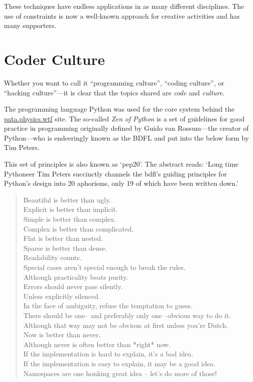 These techniques have endless applications in as many different disciplines. The use of constraints is now a well-known approach for creative activities and has many supporters.


\section{Coder Culture}
\label{s:culture}

Whether you want to call it ``programming culture'', ``coding culture'', or ``hacking culture''---it is clear that the topics shared are \emph{code} and \emph{culture}.

The programming language Python was used for the core system behind the \url{pata.physics.wtf} site. The so-called \textit{Zen of Python} is a set of guidelines for good practice in programming originally defined by Guido van Rossum---the creator of Python---who is endeeringly known as the \ac{BDFL} and put into the below form by Tim Peters.

This set of principles is also known as `\acs{pep}20'. The abstract reads: `Long time Pythoneer Tim Peters succinctly channels the \acs{bdfl}\rq s guiding principles for Python\rq s design into \num{20} aphorisms, only \num{19} of which have been written down.' \autocite*{PEP20}

\begin{quotation}
  Beautiful is better than ugly.\\
  Explicit is better than implicit.\\
  Simple is better than complex.\\
  Complex is better than complicated.\\
  Flat is better than nested.\\
  Sparse is better than dense.\\
  Readability counts.\\
  Special cases aren't special enough to break the rules.\\
  Although practicality beats purity.\\
  Errors should never pass silently.\\
  Unless explicitly silenced.\\
  In the face of ambiguity, refuse the temptation to guess.\\
  There should be one-- and preferably only one --obvious way to do it.\\
  Although that way may not be obvious at first unless you're Dutch.\\
  Now is better than never.\\
  Although never is often better than *right* now.\\
  If the implementation is hard to explain, it's a bad idea.\\
  If the implementation is easy to explain, it may be a good idea.\\
  Namespaces are one honking great idea -- let's do more of those!
\end{quotation}

